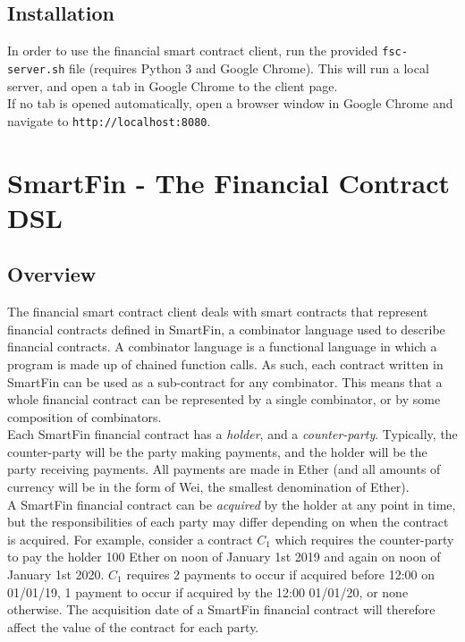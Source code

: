 \documentclass{article}
\begin{document}
\subsection{Installation} \label{UG:installation}

In order to use the financial smart contract client, run the provided \texttt{fsc-server.sh} file (requires Python 3 and Google Chrome). This will run a local server, and open a tab in Google Chrome to the client page. \\

If no tab is opened automatically, open a browser window in Google Chrome and navigate to \texttt{http://localhost:8080}.


\section{SmartFin - The Financial Contract DSL} \label{UG:DSL-guide}

\subsection{Overview} \label{UG:DSL-overview}

The financial smart contract client deals with smart contracts that represent financial contracts defined in SmartFin, a combinator language used to describe financial contracts. A combinator language is a functional language in which a program is made up of chained function calls. As such, each contract written in SmartFin can be used as a sub-contract for any combinator. This means that a whole financial contract can be represented by a single combinator, or by some composition of combinators. \\

Each SmartFin financial contract has a \textit{holder}, and a \textit{counter-party}. Typically, the counter-party will be the party making payments, and the holder will be the party receiving payments. All payments are made in Ether (and all amounts of currency will be in the form of Wei, the smallest denomination of Ether). \\

A SmartFin financial contract can be \textit{acquired} by the holder at any point in time, but the responsibilities of each party may differ depending on when the contract is acquired. For example, consider a contract $C_1$ which requires the counter-party to pay the holder 100 Ether on noon of January 1st 2019 and again on noon of January 1st 2020. $C_1$ requires 2 payments to occur if acquired before 12:00 on 01/01/19, 1 payment to occur if acquired by the 12:00 01/01/20, or none otherwise. The acquisition date of a SmartFin financial contract will therefore affect the value of the contract for each party. \\
\end{document}
